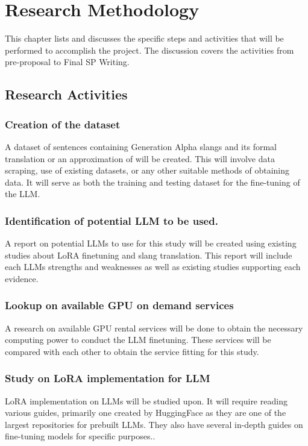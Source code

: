 \chapter{Research Methodology}
This chapter lists and discusses the specific steps and activities that will be performed  to accomplish the project. 
The discussion covers the activities from pre-proposal to Final SP Writing.

\section{Research Activities}
\subsection{Creation of the dataset} 
A dataset of sentences containing Generation Alpha slangs and its formal translation or an approximation of will be created. This will involve data scraping, use of existing datasets, or any other suitable methods of obtaining data. It will serve as both the training and testing dataset for the fine-tuning of the LLM.

\subsection{Identification of potential LLM to be used.} 
A report on potential LLMs to use for this study will be created using existing studies about LoRA finetuning and slang translation. This report will include each LLMs strengths and weaknesses as well as existing studies supporting each evidence.

\subsection{Lookup on available GPU on demand services} 
A research on available GPU rental services will be done to obtain the necessary computing power to conduct the LLM finetuning. These services will be compared with each other to obtain the service fitting for this study.

\subsection{Study on LoRA implementation for LLM}
LoRA implementation on LLMs will be studied upon. It will require reading various guides, primarily one created by HuggingFace as they are one of the largest repositories for prebuilt LLMs. They also have several in-depth guides on fine-tuning models for specific purposes..

